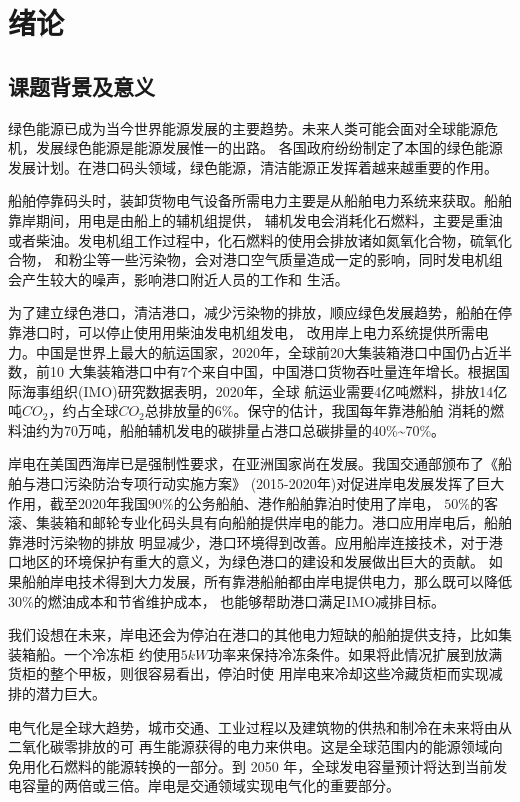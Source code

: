 \chapter{绪论}

\section{课题背景及意义}
绿色能源已成为当今世界能源发展的主要趋势。未来人类可能会面对全球能源危机，发展绿色能源是能源发展惟一的出路。
各国政府纷纷制定了本国的绿色能源发展计划。在港口码头领域，绿色能源，清洁能源正发挥着越来越重要的作用。

船舶停靠码头时，装卸货物电气设备所需电力主要是从船舶电力系统来获取。船舶靠岸期间，用电是由船上的辅机组提供，
辅机发电会消耗化石燃料，主要是重油或者柴油。发电机组工作过程中，化石燃料的使用会排放诸如氮氧化合物，硫氧化合物，
和粉尘等一些污染物，会对港口空气质量造成一定的影响，同时发电机组会产生较大的噪声，影响港口附近人员的工作和
生活。

为了建立绿色港口，清洁港口，减少污染物的排放，顺应绿色发展趋势，船舶在停靠港口时，可以停止使用用柴油发电机组发电，
改用岸上电力系统提供所需电力。中国是世界上最大的航运国家，2020年，全球前20大集装箱港口中国仍占近半数，前10
大集装箱港口中有7个来自中国，中国港口货物吞吐量连年增长。根据国际海事组织(IMO)研究数据表明，2020年，全球
航运业需要4亿吨燃料，排放14亿吨$CO_{2}$，约占全球$CO_{2}$总排放量的$6\%$。保守的估计，我国每年靠港船舶
消耗的燃料油约为$70$万吨，船舶辅机发电的碳排量占港口总碳排量的40\%\~{}70\%\cite{RN8}。

岸电在美国西海岸已是强制性要求，在亚洲国家尚在发展。我国交通部颁布了《船舶与港口污染防治专项行动实施方案》
(2015-2020年)对促进岸电发展发挥了巨大作用，截至2020年我国$90\%$的公务船舶、港作船舶靠泊时使用了岸电，
$50\%$的客滚、集装箱和邮轮专业化码头具有向船舶提供岸电的能力。港口应用岸电后，船舶靠港时污染物的排放
明显减少，港口环境得到改善。应用船岸连接技术，对于港口地区的环境保护有重大的意义，为绿色港口的建设和发展做出巨大的贡献。
如果船舶岸电技术得到大力发展，所有靠港船舶都由岸电提供电力，那么既可以降低$30\%$的燃油成本\cite{RN9}和节省维护成本，
也能够帮助港口满足IMO减排目标。

我们设想在未来，岸电还会为停泊在港口的其他电力短缺的船舶提供支持，比如集装箱船。一个冷冻柜
约使用$5kW$功率来保持冷冻条件。如果将此情况扩展到放满货柜的整个甲板，则很容易看出，停泊时使
用岸电来冷却这些冷藏货柜而实现减排的潜力巨大。

电气化是全球大趋势，城市交通、工业过程以及建筑物的供热和制冷在未来将由从二氧化碳零排放的可
再生能源获得的电力来供电。这是全球范围内的能源领域向免用化石燃料的能源转换的一部分。到 2050
年，全球发电容量预计将达到当前发电容量的两倍或三倍。岸电是交通领域实现电气化的重要部分。

